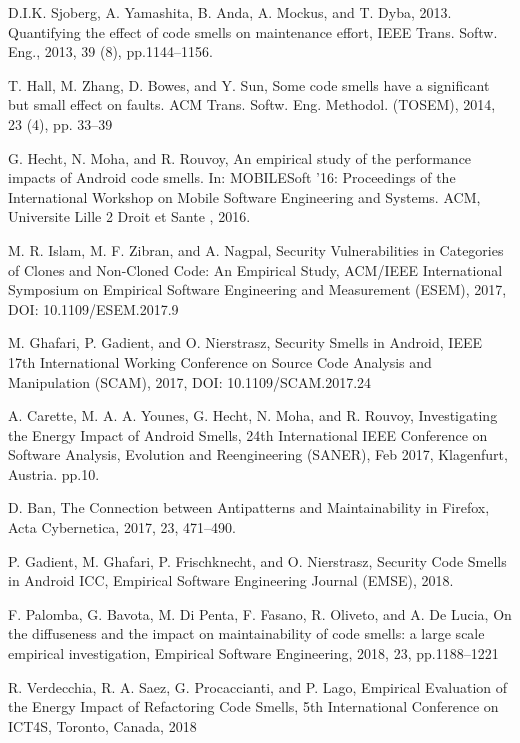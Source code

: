 \documentclass{sigchi}
\begin{document}
\begin{thebibliography}{2}
	 D.I.K. Sjoberg, A. Yamashita, B. Anda, A. Mockus, and T. Dyba, 2013. Quantifying the effect of code smells on maintenance effort, IEEE Trans. Softw. Eng., 2013, 39 (8), pp.1144–1156.
	
	 T. Hall, M. Zhang, D. Bowes, and Y. Sun, Some code smells have a significant but small effect on faults. ACM Trans. Softw. Eng. Methodol. (TOSEM), 2014, 23 (4), pp. 33–39 
	
	 G. Hecht, N. Moha, and R. Rouvoy, An empirical study of the performance impacts of Android code smells. In: MOBILESoft ’16: Proceedings of the International Workshop on Mobile Software Engineering and Systems. ACM, Universite Lille 2 Droit et Sante , 2016.
	
	 M. R. Islam, M. F. Zibran, and A. Nagpal, Security Vulnerabilities in Categories of Clones and Non-Cloned Code: An Empirical Study, ACM/IEEE International Symposium on Empirical Software Engineering and Measurement (ESEM), 2017, DOI: 10.1109/ESEM.2017.9
	
	 M. Ghafari, P. Gadient, and O. Nierstrasz, Security Smells in Android,  IEEE 17th International Working Conference on Source Code Analysis and Manipulation (SCAM), 2017, DOI: 10.1109/SCAM.2017.24  
	
	 A. Carette, M. A. A. Younes, G. Hecht, N. Moha, and R. Rouvoy, Investigating the Energy Impact of Android Smells, 24th International IEEE Conference on Software Analysis, Evolution and Reengineering (SANER), Feb 2017, Klagenfurt, Austria. pp.10. 
	
	D. Ban, The Connection between Antipatterns and Maintainability in Firefox, Acta Cybernetica, 2017, 23, 471–490. 
	
	 P. Gadient, M. Ghafari, P. Frischknecht, and O. Nierstrasz, Security Code Smells in Android ICC, Empirical Software Engineering Journal (EMSE), 2018.
	
	 F. Palomba, G. Bavota, M. Di Penta, F. Fasano, R. Oliveto, and A. De Lucia, On the diffuseness and the impact on maintainability of code smells: a large scale empirical investigation, Empirical Software Engineering, 2018, 23, pp.1188–1221
	
	 R. Verdecchia, R. A. Saez, G. Procaccianti, and P. Lago, Empirical Evaluation of the Energy Impact of Refactoring Code Smells, 5th International Conference on ICT4S, Toronto, Canada, 2018
	

\end{thebibliography}
\end{document}
